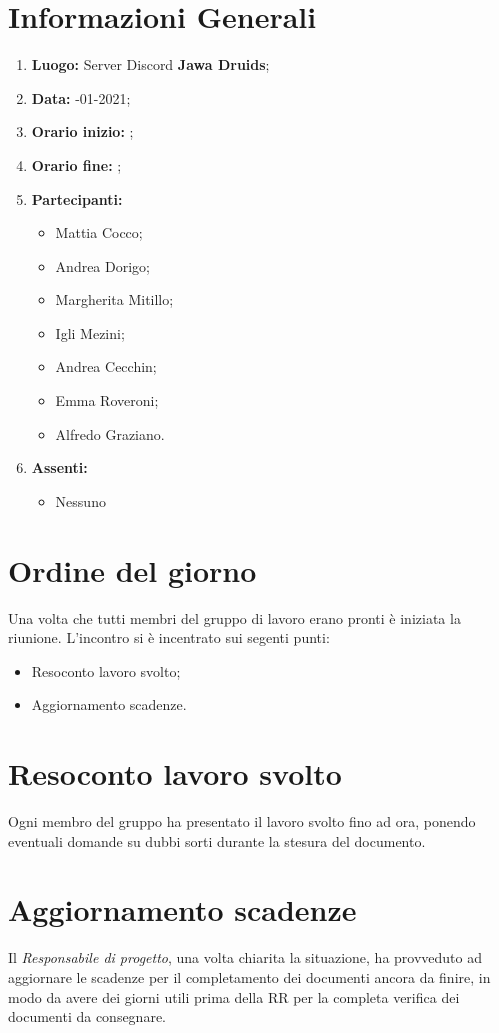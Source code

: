 	\newpage
	\section{Informazioni Generali}
	\begin{enumerate}
		\item \textbf{Luogo:} \normalfont Server Discord \textbf{Jawa Druids};
		\item \textbf{Data:} -01-2021;
		\item \textbf{Orario inizio:} ;
		\item \textbf{Orario fine:} ;
		\item \textbf{Partecipanti:}
		\begin{itemize}
			\item Mattia Cocco;
			\item Andrea Dorigo;
			\item Margherita Mitillo;
			\item Igli Mezini;
			\item Andrea Cecchin;
			\item Emma Roveroni;
			\item Alfredo Graziano.
		\end{itemize}
		\item \textbf{Assenti:}
		\begin{itemize}
			\item Nessuno
		\end{itemize}
	\end{enumerate}
	\section{Ordine del giorno}
	Una volta che tutti membri del gruppo di lavoro erano pronti è iniziata la riunione. L'incontro si è incentrato sui segenti punti:
	\begin{itemize}
		\item Resoconto lavoro svolto;
		\item Aggiornamento scadenze.
	\end{itemize}

	\section{Resoconto lavoro svolto}
	Ogni membro del gruppo ha presentato il lavoro svolto fino ad ora, ponendo eventuali domande su dubbi sorti durante la stesura del documento.

	\section{Aggiornamento scadenze}
	Il \textit{Responsabile di progetto}, una volta chiarita la situazione, ha provveduto ad aggiornare le scadenze per il completamento dei documenti ancora da finire, in modo da avere dei giorni utili prima della RR per la completa verifica dei documenti da consegnare.
